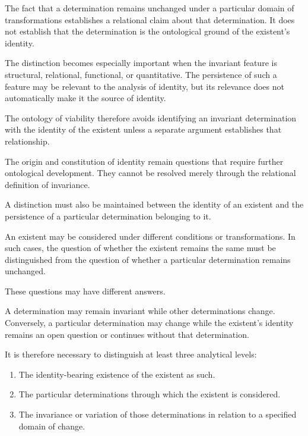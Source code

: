 The fact that a determination remains unchanged
under a particular domain of transformations establishes
a relational claim about that determination. It does
not establish that the determination is the ontological
ground of the existent's identity.

The distinction becomes especially important when
the invariant feature is structural, relational,
functional, or quantitative. The persistence of such
a feature may be relevant to the analysis of identity,
but its relevance does not automatically make it
the source of identity.

The ontology of viability therefore avoids identifying
an invariant determination with the identity of the
existent unless a separate argument establishes
that relationship.

The origin and constitution of identity remain
questions that require further ontological development.
They cannot be resolved merely through the relational
definition of invariance.


A distinction must also be maintained between the
identity of an existent and the persistence of a
particular determination belonging to it.

An existent may be considered under different
conditions or transformations. In such cases,
the question of whether the existent remains the
same must be distinguished from the question of
whether a particular determination remains unchanged.

These questions may have different answers.

A determination may remain invariant while other
determinations change. Conversely, a particular
determination may change while the existent's
identity remains an open question or continues
without that determination.

It is therefore necessary to distinguish at least
three analytical levels:

\begin{enumerate}
    \item The identity-bearing existence of the
    existent as such.

    \item The particular determinations through
    which the existent is considered.

    \item The invariance or variation of those
    determinations in relation to a specified
    domain of change.
\end{enumerate}

